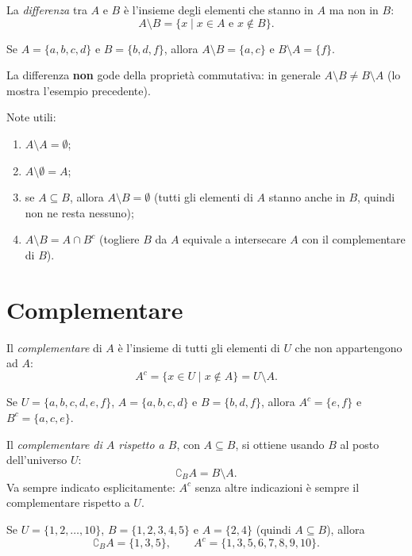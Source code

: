 \documentclass[11pt,a4paper]{article}
\begin{document}
\begin{definizione}
La \emph{differenza} tra $A$ e $B$ è l'insieme degli elementi che
stanno in $A$ ma non in $B$:
\[
A \setminus B = \{x \mid x \in A \text{ e } x \notin B\}.
\]
\end{definizione}

\begin{esempio}
Se $A = \{a, b, c, d\}$ e $B = \{b, d, f\}$, allora
$A \setminus B = \{a, c\}$ e $B \setminus A = \{f\}$.
\end{esempio}

La differenza \textbf{non} gode della proprietà commutativa: in generale
$A \setminus B \neq B \setminus A$ (lo mostra l'esempio precedente).

Note utili:
\begin{enumerate}
    \item $A \setminus A = \emptyset$;
    \item $A \setminus \emptyset = A$;
    \item se $A \subseteq B$, allora $A \setminus B = \emptyset$
          (tutti gli elementi di $A$ stanno anche in $B$, quindi non ne
          resta nessuno);
    \item $A \setminus B = A \cap B^c$ (togliere $B$ da $A$ equivale a
          intersecare $A$ con il complementare di $B$).
\end{enumerate}

\section{Complementare}

\begin{definizione}
Il \emph{complementare} di $A$ è l'insieme di tutti gli elementi di $U$
che non appartengono ad $A$:
\[
A^c = \{x \in U \mid x \notin A\} = U \setminus A.
\]
\end{definizione}

\begin{esempio}
Se $U = \{a, b, c, d, e, f\}$, $A = \{a, b, c, d\}$ e $B = \{b, d, f\}$,
allora $A^c = \{e, f\}$ e $B^c = \{a, c, e\}$.
\end{esempio}

Il \emph{complementare di $A$ rispetto a $B$}, con $A \subseteq B$, si
ottiene usando $B$ al posto dell'universo $U$:
\[
\complement_B A = B \setminus A.
\]
Va sempre indicato esplicitamente: $A^c$ senza altre indicazioni è sempre
il complementare rispetto a $U$.

\begin{esempio}
Se $U = \{1, 2, \dots, 10\}$, $B = \{1, 2, 3, 4, 5\}$ e $A = \{2, 4\}$
(quindi $A \subseteq B$), allora
\[
\complement_B A = \{1, 3, 5\}, \qquad A^c = \{1, 3, 5, 6, 7, 8, 9, 10\}.
\]
\end{esempio}
\end{document}

